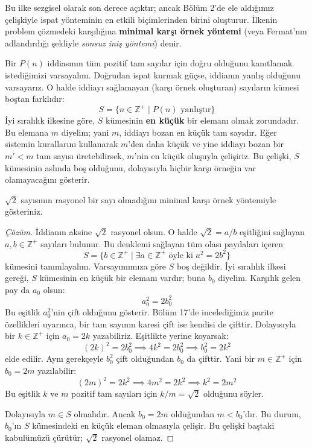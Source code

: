 Bu ilke sezgisel olarak son derece açıktır; ancak Bölüm 2'de ele aldığımız çelişkiyle ispat yönteminin en etkili biçimlerinden birini oluşturur. İlkenin problem çözmedeki karşılığına \textbf{minimal karşı örnek yöntemi} (veya Fermat'nın adlandırdığı şekliyle \emph{sonsuz iniş yöntemi}) denir.

Bir $P(n)$ iddiasının tüm pozitif tam sayılar için doğru olduğunu kanıtlamak istediğimizi varsayalım. Doğrudan ispat kurmak güçse, iddianın yanlış olduğunu varsayarız. O halde iddiayı sağlamayan (karşı örnek oluşturan) sayıların kümesi boştan farklıdır:
\[
S = \{n \in \mathbb{Z}^+ \mid P(n) \text{ yanlıştır}\}
\]
İyi sıralılık ilkesine göre, $S$ kümesinin \textbf{en küçük} bir elemanı olmak zorundadır. Bu elemana $m$ diyelim; yani $m$, iddiayı bozan en küçük tam sayıdır. Eğer sistemin kurallarını kullanarak $m$'den daha küçük ve yine iddiayı bozan bir $m' < m$ tam sayısı üretebilirsek, $m$'nin en küçük oluşuyla çelişiriz. Bu çelişki, $S$ kümesinin aslında boş olduğunu, dolayısıyla hiçbir karşı örneğin var olamayacağını gösterir.

\begin{example}
$\sqrt{2}$ sayısının rasyonel bir sayı olmadığını minimal karşı örnek yöntemiyle gösteriniz.
\end{example}

\begin{proof}[Çözüm]
İddianın aksine $\sqrt{2}$ rasyonel olsun. O halde $\sqrt{2} = a/b$ eşitliğini sağlayan $a, b \in \mathbb{Z}^+$ sayıları bulunur. Bu denklemi sağlayan tüm olası paydaları içeren
\[
S = \{b \in \mathbb{Z}^+ \mid \exists a \in \mathbb{Z}^+ \text{ öyle ki } a^2 = 2b^2\}
\]
kümesini tanımlayalım. Varsayımımıza göre $S$ boş değildir. İyi sıralılık ilkesi gereği, $S$ kümesinin en küçük bir elemanı vardır; buna $b_0$ diyelim. Karşılık gelen pay da $a_0$ olsun:
\[
a_0^2 = 2b_0^2
\]
Bu eşitlik $a_0^2$'nin çift olduğunu gösterir. Bölüm 17'de incelediğimiz parite özellikleri uyarınca, bir tam sayının karesi çift ise kendisi de çifttir. Dolayısıyla bir $k \in \mathbb{Z}^+$ için $a_0 = 2k$ yazabiliriz. Eşitlikte yerine koyarsak:
\[
(2k)^2 = 2b_0^2 \implies 4k^2 = 2b_0^2 \implies b_0^2 = 2k^2
\]
elde edilir. Aynı gerekçeyle $b_0^2$ çift olduğundan $b_0$ da çifttir. Yani bir $m \in \mathbb{Z}^+$ için $b_0 = 2m$ yazılabilir:
\[
(2m)^2 = 2k^2 \implies 4m^2 = 2k^2 \implies k^2 = 2m^2
\]
Bu eşitlik $k$ ve $m$ pozitif tam sayıları için $k/m = \sqrt{2}$ olduğunu söyler.

Dolayısıyla $m \in S$ olmalıdır. Ancak $b_0 = 2m$ olduğundan $m < b_0$'dır. Bu durum, $b_0$'ın $S$ kümesindeki en küçük eleman olmasıyla çelişir. Bu çelişki baştaki kabulümüzü çürütür; $\sqrt{2}$ rasyonel olamaz.
\end{proof}

